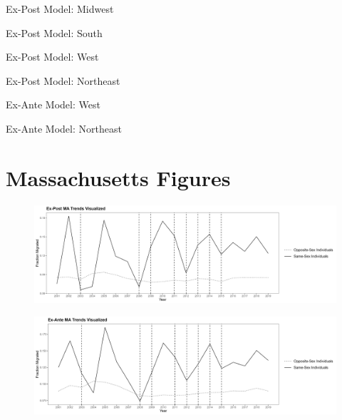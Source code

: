 \documentclass[12pt,letterpaper]{article}
\begin{document}
\begin{table}[h] %
    \centering
    \caption{Ex-Post Model: Midwest}
    \label{tab: midwest_expost_model}
    
\end{table}
\begin{table}[h]
    \centering
    \caption{Ex-Post Model: South}
    \label{tab: south_expost_model}
    
\end{table}
\begin{table}[h] %
    \centering
    \caption{Ex-Post Model: West}
    \label{tab: west_expost_model}
    
\end{table}
\begin{table}[h]
    \centering
    \caption{Ex-Post Model: Northeast}
    \label{tab: northeast_expost_model}
    
\end{table}
\begin{table}[h] %
    \centering
    \caption{Ex-Ante Model: West}
    \label{tab: west_exante_model}
    
\end{table}
\FloatBarrier
\begin{table}[h] %
    \centering
    \caption{Ex-Ante Model: Northeast}
    \label{tab: northeast_exante_model}
    
\end{table}

\clearpage
\newpage
\section{Massachusetts Figures}
\begin{figure}[h]
    \centering
    \includegraphics[width=0.75\linewidth]{outputs/summary_stats/MA_post_trends.png}
    \caption{}
    \label{fig: MA_post_trends}
\end{figure}

\begin{figure}[h]
    \centering
    \includegraphics[width=0.75\linewidth]{outputs/summary_stats/MA_ante_trends.png}
    \caption{}
    \label{fig: MA_ante_trends}
\end{figure}
\end{document}
